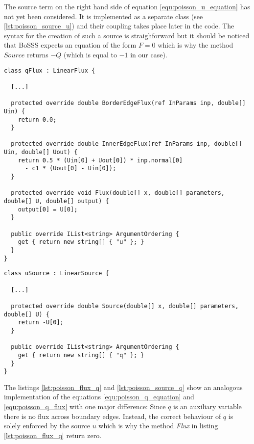 The source term on the right hand side of equation \ref{equ:poisson_u_equation}
has not yet been considered. It is implemented as a separate class (see
\ref{lst:poisson_source_u}) and their coupling takes place later in the code. 
The syntax for the creation of such a source is straighforward but it should be
noticed that BoSSS expects an equation of the form $F = 0$ which is why the
method $Source$ returns $-Q$ (which is equal to $-1$ in our case).

\begin{lstlisting}[caption=BoSSS implementation of the left hand side of 
equation \ref{equ:poisson_q_equation} and of equation 
\ref{equ:poisson_q_flux}, label=lst:poisson_flux_q]
class qFlux : LinearFlux {
    
  [...]
    
  protected override double BorderEdgeFlux(ref InParams inp, double[] Uin) {
    return 0.0;
  }
      
  protected override double InnerEdgeFlux(ref InParams inp, double[] Uin, double[] Uout) {
    return 0.5 * (Uin[0] + Uout[0]) * inp.normal[0]
      - c1 * (Uout[0] - Uin[0]);
  }

  protected override void Flux(double[] x, double[] parameters, double[] U, double[] output) {
    output[0] = U[0];
  }
  
  public override IList<string> ArgumentOrdering {
    get { return new string[] { "u" }; }
  }
}
\end{lstlisting}

\begin{lstlisting}[caption=BoSSS implementation of the right hand side of
equation \ref{equ:poisson_q_equation}, label=lst:poisson_source_q]
class uSource : LinearSource {
  
  [...]
  
  protected override double Source(double[] x, double[] parameters, double[] U) {
    return -U[0];
  }
  
  public override IList<string> ArgumentOrdering {
    get { return new string[] { "q" }; }
  }
}
\end{lstlisting}

The listings \ref{lst:poisson_flux_q} and  \ref{lst:poisson_source_q} show an
analogous implementation of the equations \ref{equ:poisson_q_equation} and
\ref{equ:poisson_q_flux} with one major difference: Since $q$ is an auxiliary
variable there is no flux across boundary edges. Instead, the correct behaviour
of $q$ is solely enforced by the source $u$ which is why the method 
\emph{Flux} in listing \ref{lst:poisson_flux_q} return zero.

